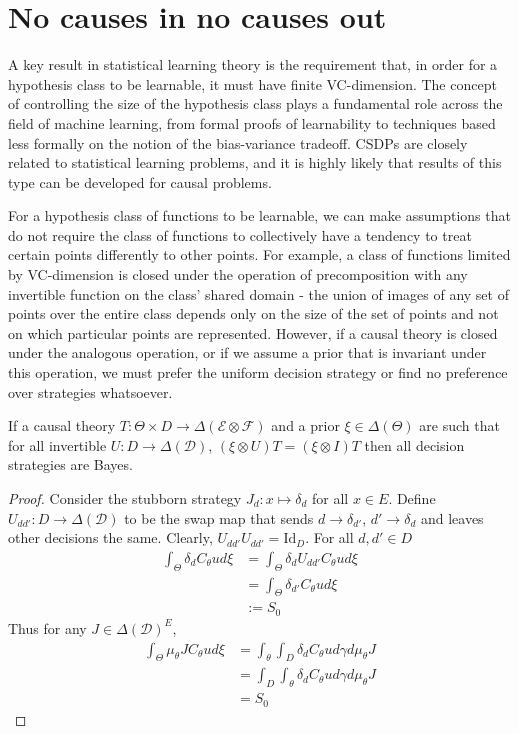 \section{No causes in no causes out}

A key result in statistical learning theory is the requirement that, in order for a hypothesis class to be learnable, it must have finite VC-dimension. The concept of controlling the size of the hypothesis class plays a fundamental role across the field of machine learning, from formal proofs of learnability to techniques based less formally on the notion of the bias-variance tradeoff. CSDPs are closely related to statistical learning problems, and it is highly likely that results of this type can be developed for causal problems.

For a hypothesis class of functions to be learnable, we can make assumptions that do not require the class of functions to collectively have a tendency to treat certain points differently to other points. For example, a class of functions limited by VC-dimension is closed under the operation of precomposition with any invertible function on the class' shared domain - the union of images of any set of points over the entire class depends only on the size of the set of points and not on which particular points are represented. However, if a causal theory is closed under the analogous operation, or if we assume a prior that is invariant under this operation, we must prefer the uniform decision strategy or find no preference over strategies whatsoever.

\begin{theorem}\label{th:ncinco}
If a causal theory $T:\Theta\times D\to \Delta(\mathcal{E}\otimes\mathcal{F})$ and a prior $\xi\in \Delta(\Theta)$ are such that for all invertible $U:D\to \Delta(\mathcal{D})$, $(\xi\otimes U)T = (\xi\otimes I)T$ then all decision strategies are Bayes.
\end{theorem}

\begin{proof}
Consider the stubborn strategy $J_d:x\mapsto \delta_d$ for all $x\in E$. Define $U_{dd'}:D\to \Delta(\mathcal{D})$ to be the swap map that sends $d\to \delta_{d'}$, $d'\to \delta_{d}$ and leaves other decisions the same. Clearly, $U_{dd'} U_{dd'} = \mathrm{Id}_D$. For all $d,d'\in D$
\begin{align}
	\int_\Theta \delta_d C_\theta u d\xi &= \int_\Theta \delta_d U_{dd'} C_\theta u d\xi\\
										&= \int_\Theta \delta_{d'} C_\theta u d\xi\\
										 &:= S_0
\end{align}
Thus for any $J\in \Delta(\mathcal{D})^E$,
\begin{align}
	\int_\Theta \mu_\theta J C_\theta u d\xi &= \int_\theta \int_D \delta_d C_\theta u d\gamma d\mu_\theta J\\
											 &= \int_D \int_\theta \delta_d C_\theta u d\gamma d\mu_\theta J\\
											 &= S_0
\end{align}
\end{proof}


